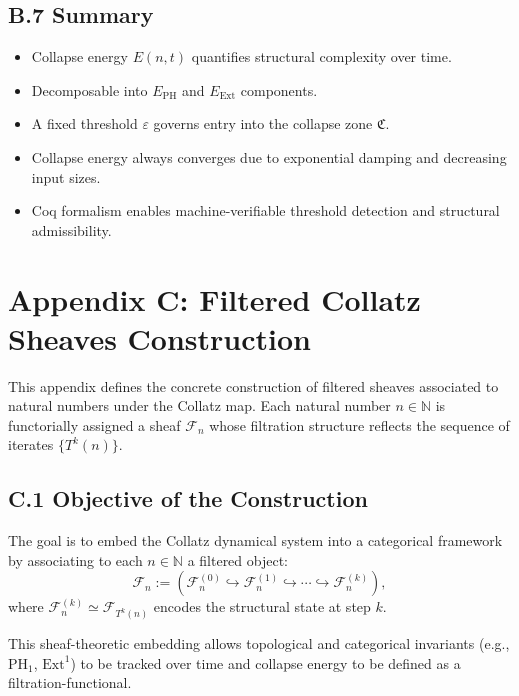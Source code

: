 \documentclass[11pt]{article}
\begin{document}
\subsection*{B.7 Summary}

\begin{itemize}
  \item Collapse energy \( E(n,t) \) quantifies structural complexity over time.
  \item Decomposable into \( E_{\mathrm{PH}} \) and \( E_{\mathrm{Ext}} \) components.
  \item A fixed threshold \( \varepsilon \) governs entry into the collapse zone \( \mathfrak{C} \).
  \item Collapse energy always converges due to exponential damping and decreasing input sizes.
  \item Coq formalism enables machine-verifiable threshold detection and structural admissibility.
\end{itemize}



\appendix
\section*{Appendix C: Filtered Collatz Sheaves Construction}

This appendix defines the concrete construction of filtered sheaves associated to natural numbers under the Collatz map. Each natural number \( n \in \mathbb{N} \) is functorially assigned a sheaf \( \mathcal{F}_n \) whose filtration structure reflects the sequence of iterates \( \{T^k(n)\} \).

\subsection*{C.1 Objective of the Construction}

The goal is to embed the Collatz dynamical system into a categorical framework by associating to each \( n \in \mathbb{N} \) a filtered object:
\[
\mathcal{F}_n := \left( \mathcal{F}_n^{(0)} \hookrightarrow \mathcal{F}_n^{(1)} \hookrightarrow \cdots \hookrightarrow \mathcal{F}_n^{(k)} \right),
\]
where \( \mathcal{F}_n^{(k)} \simeq \mathcal{F}_{T^k(n)} \) encodes the structural state at step \( k \).

This sheaf-theoretic embedding allows topological and categorical invariants (e.g., \( \mathrm{PH}_1 \), \( \mathrm{Ext}^1 \)) to be tracked over time and collapse energy to be defined as a filtration-functional.
\end{document}
